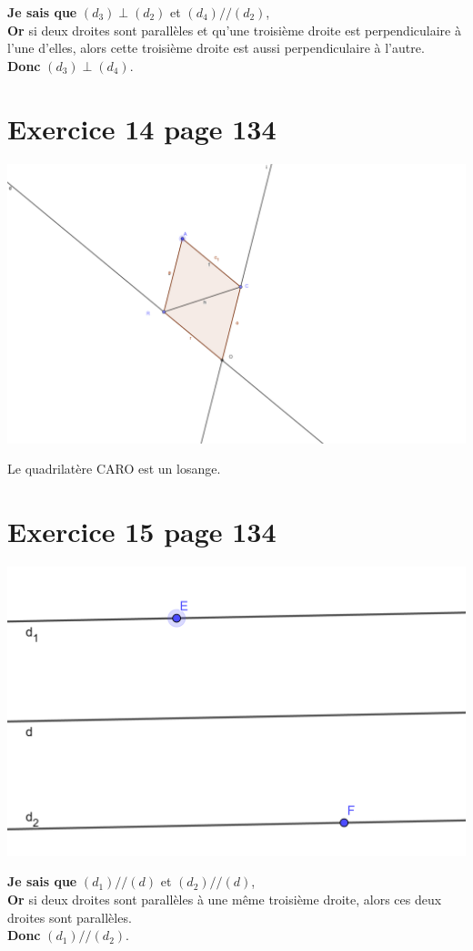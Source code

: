 \documentclass[12pt,a4paper]{article}
\begin{document}
\noindent \textbf{Je sais que} $(d_3) \perp (d_2)$ et $(d_4) // (d_2)$,\\
\textbf{Or} si deux droites sont parallèles et qu'une troisième droite est perpendiculaire à l'une d'elles, alors cette troisième droite est aussi perpendiculaire à l'autre.\\
\textbf{Donc} $(d_3) \perp (d_4)$.


\section*{Exercice 14 page 134}


\begin{center}
	\includegraphics[scale=0.15]{ex14_p134}
\end{center}

Le quadrilatère CARO est un losange.

\section*{Exercice 15 page 134}

\begin{center}
	\includegraphics[scale=0.15]{ex15_p134}
\end{center}

\noindent \textbf{Je sais que} $(d_1) // (d)$ et $(d_2) // (d)$,\\
\textbf{Or} si deux droites sont parallèles à une même troisième droite, alors ces deux droites sont parallèles.\\
\textbf{Donc} $(d_1) // (d_2)$.
\end{document}
